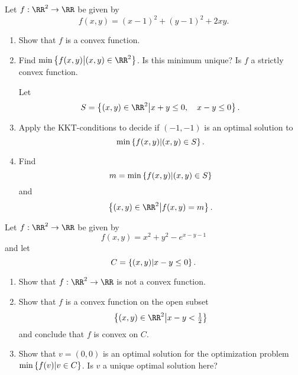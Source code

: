 \documentclass{article}
\begin{document}
  Let $f:\RR^2\rightarrow \RR$ be given by
  \begin{equation*}
    f(x, y) = (x-1)^2+ (y-1)^2 + 2 x y.
  \end{equation*}
  \begin{enumerate}
  \item Show that $f$ is a convex function.

  \item Find $\min\Set{ f(x, y) }{ (x, y)\in \RR^2 }$. Is this minimum
    unique?  Is $f$ a strictly convex function.

    Let
    \begin{equation*}
      S = \Set{ (x, y)\in \RR^2 }{
        x + y \leq 0, \quad x - y \leq 0
      }.
    \end{equation*}
  \item Apply the KKT-conditions to decide if $(-1, -1)$ is an optimal
    solution to
    \begin{equation*}
      \min\left\{  f(x, y)  \middle|  (x, y)\in S  \right\}.
    \end{equation*} 
  \item Find
    \begin{equation*}
      m = \min\left\{  f(x, y)  \middle|  (x, y)\in S  \right\}
    \end{equation*}
    and
    \begin{equation*}
      \Set{ (x, y)\in \RR^2 }{ f(x, y) = m }.
    \end{equation*}
  \end{enumerate}
\endshex

\beginshex

  Let $f:\RR^2\rightarrow \RR$ be given by
  \begin{equation*}
    f(x, y) = x^2 + y^2 - e^{x-y-1}
  \end{equation*}
  and let
  \begin{equation*}
    C =\left\{  (x, y)  \middle|  x - y \leq 0  \right\}.
  \end{equation*}
  \begin{enumerate}
  \item Show that $f:\RR^2\rightarrow \RR$ is not a convex function.
  \item Show that $f$ is a convex function on the open subset
    \begin{equation*}
      \Set{ (x, y) \in \RR^2 }{ x - y< \tfrac{1}{2} }
    \end{equation*}
    and conclude that $f$ is convex on $C$.
  \item Show that $v = (0,0)$ is an optimal solution for the
    optimization problem $\min\left\{  f(v)  \middle|  v\in C  \right\}$. Is $v$ a unique
    optimal solution here?
  \end{enumerate}
\endshex
\end{document}
